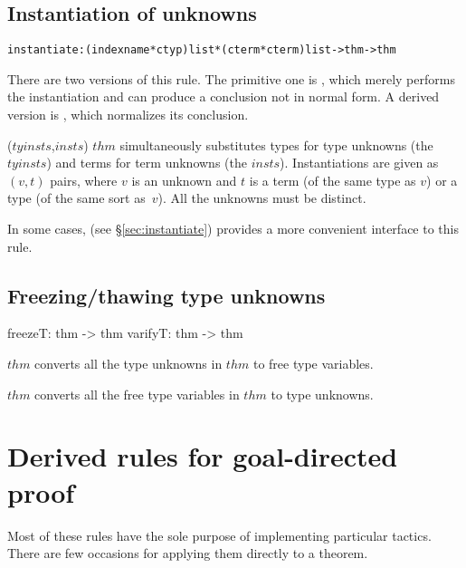\subsection{Instantiation of unknowns}
\begin{alltt}\footnotesize
instantiate: (indexname * ctyp){\thinspace}list * (cterm * cterm){\thinspace}list -> thm -> thm
\end{alltt}
There are two versions of this rule.  The primitive one is
, which merely performs the instantiation and can
produce a conclusion not in normal form.  A derived version is  
, which normalizes its conclusion.

\begin{ttdescription}
\item[\ttindexbold{instantiate} ($tyinsts$,$insts$) $thm$] 
simultaneously substitutes types for type unknowns (the
$tyinsts$) and terms for term unknowns (the $insts$).  Instantiations are
given as $(v,t)$ pairs, where $v$ is an unknown and $t$ is a term (of the
same type as $v$) or a type (of the same sort as~$v$).  All the unknowns
must be distinct.  

In some cases,  (see \S\ref{sec:instantiate})
provides a more convenient interface to this rule.
\end{ttdescription}




\subsection{Freezing/thawing type unknowns}
\begin{ttbox} 
freezeT: thm -> thm
varifyT: thm -> thm
\end{ttbox}
\begin{ttdescription}
\item[\ttindexbold{freezeT} $thm$] 
converts all the type unknowns in $thm$ to free type variables.

\item[\ttindexbold{varifyT} $thm$] 
converts all the free type variables in $thm$ to type unknowns.
\end{ttdescription}


\section{Derived rules for goal-directed proof}
Most of these rules have the sole purpose of implementing particular
tactics.  There are few occasions for applying them directly to a theorem.

